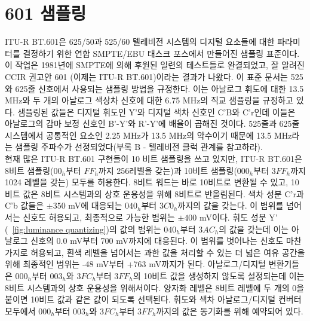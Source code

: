 \section{601 샘플링}
ITU-R BT.601은 625/50과 525/60 텔레비전 시스템의 디지털 요소들에 대한 파라미터를 결정하기 위한 연합 SMPTE/EBU 태스크 포스에서 만들어진 샘플링 표준이다.
이 작업은 1981년에 SMPTE에 의해 후원된 일련의 테스트들로 완결되었고, 잘 알려진 CCIR 권고안 601 (이제는 ITU-R BT.601)이라는 결과가 나왔다.
이 표준 문서는 525와 625줄 신호에서 사용되는 샘플링 방법을 규정한다. 이는 아날로그 휘도에 대한 13.5 MHz와 두 개의 아날로그 색상차 신호에 대한 6.75 MHz의 직교 샘플링을 규정하고 있다.
샘플링된 값들은 디지털 휘도인 Y'와 디지털 색차 신호인 C'B와 C'r인데 이들은 아날로그의 감마 보정 신호인 B'-Y'와 R'-Y'에 배율이 곱해진 것이다.
525줄과 625줄 시스템에서 공통적인 요소인 2.25 MHz가 13.5 MHz의 약수이기 때문에 13.5 MHz라는 샘플링 주파수가 선정되었다(부록 B - 텔레비전 클럭 관계를 참고하라).
\\
현재 많은 ITU-R BT.601 구현들이 10 비트 샘플링을 쓰고 있지만, ITU-R BT.601은 8비트 샘플링($00_h$부터 $FF_h$까지 256레벨을 갖는)과 10비트 샘플링($000_h$부터 $3FF_h$까지 1024 레벨을 갖는) 모두를 허용한다.
8비트 워드는 바로 10비트로 변환될 수 있고, 10비트 값은 8비트 시스템과의 상호 운용성을 위해 8비트로 반올림된다. 색차 성분 C'r과 C'b 값들은 $\pm 350$ mV에 대응되는 $040_h$부터 $3C0_h$까지의 값을 갖는다.
이 범위를 넘어서는 신호도 허용되고, 최종적으로 가능한 범위는 $\pm 400$ mV이다. 휘도 성분 Y' (\figurename~\ref{fig:luminance quantizing})의 값의 범위는 $040_h$부터 $3AC_h$의 값을 갖는데 이는 아날로그 신호의 0.0 mV부터 700 mV까지에 대응된다.
이 범위를 벗어나는 신호도 마찬가지로 허용되고, 흰색 레벨을 넘어서는 과한 값을 처리할 수 있는 더 넓은 여유 공간을 위해 최종적인 범위는 -48 mV부터 +763 mV까지가 된다.
아날로그/디지털 변환기들은 $000_h$부터 $003_h$와 $3FC_h$부터 $3FF_h$의 10비트 값을 생성하지 않도록 설정되는데 이는 8비트 시스템과의 상호 운용성을 위해서이다.
양자화 레벨은 8비트 레벨에 두 개의 0을 붙이면 10비트 값과 같은 값이 되도록 선택된다. 휘도와 색차 아날로그/디지털 컨버터 모두에서 $000_h$부터 $003_h$와 $3FC_h$부터 $3FF_h$까지의 값은 동기화를 위해 예약되어 있다.
\\
